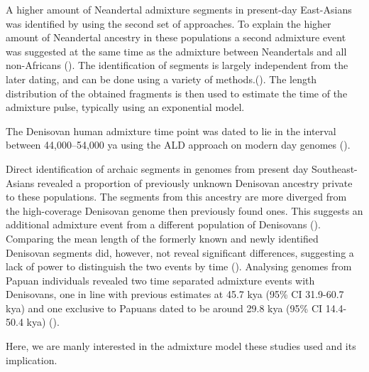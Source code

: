 \documentclass[]{article}
\begin{document}
A higher amount of Neandertal admixture segments in present-day East-Asians was identified by using the second set of approaches. To explain the higher amount of Neandertal ancestry in these populations a second admixture event was suggested at the same time as the admixture between Neandertals and
all non-Africans (\cite{kim_selection_2015,vernot_complex_2015}).  The identification of segments is largely independent from the later dating, and can be done using a variety of methods.(\cite{racimo_signatures_2017,seguin_orlando_paleogenomics_2014,vernot_excavating_2016,sankararaman_combined_2016,skov_detecting_2018}). The length distribution of the obtained fragments is then used to estimate the time of the admixture pulse, typically using an exponential model.

The Denisovan human
admixture time point was dated to lie in the interval between 44,000--54,000 ya using the ALD
approach on modern day genomes (\cite{sankararaman_combined_2016}).

Direct identification of archaic segments in genomes from present day Southeast-Asians revealed a proportion of previously unknown Denisovan ancestry private to these populations. The segments from this ancestry are more diverged from the high-coverage Denisovan genome then previously found ones. This suggests an additional admixture event from a different population of Denisovans (\cite{browning_analysis_2018}).
Comparing the mean length of the formerly known and newly identified Denisovan segments did, however, not reveal
significant differences, suggesting a lack of power to distinguish the
two events by time (\cite{browning_analysis_2018,jacobs_multiple_2019}).
Analysing genomes from Papuan individuals revealed two time separated
admixture events with Denisovans, one in line with previous estimates at
45.7 kya (95\% CI 31.9-60.7 kya) and one exclusive to Papuans dated to
be around 29.8 kya (95\% CI 14.4-50.4 kya)
(\cite{jacobs_multiple_2019}).

Here, we are manly interested in the admixture model these studies used and its implication.
\end{document}
